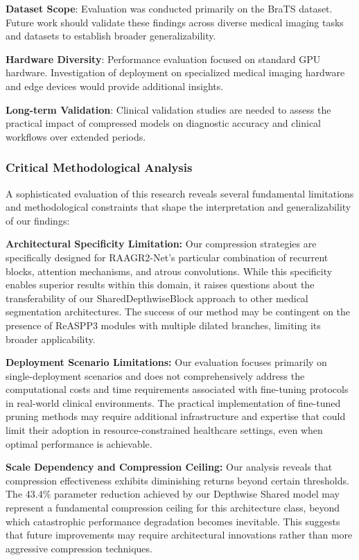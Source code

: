 \documentclass[12pt,a4paper]{article}
\begin{document}
\begin{enumerate}
\textbf{Dataset Scope}: Evaluation was conducted primarily on the BraTS dataset. Future work should validate these findings across diverse medical imaging tasks and datasets to establish broader generalizability.

\textbf{Hardware Diversity}: Performance evaluation focused on standard GPU hardware. Investigation of deployment on specialized medical imaging hardware and edge devices would provide additional insights.

\textbf{Long-term Validation}: Clinical validation studies are needed to assess the practical impact of compressed models on diagnostic accuracy and clinical workflows over extended periods.

\subsubsection{Critical Methodological Analysis}

A sophisticated evaluation of this research reveals several fundamental limitations and methodological constraints that shape the interpretation and generalizability of our findings:

\textbf{Architectural Specificity Limitation:} Our compression strategies are specifically designed for RAAGR2-Net's particular combination of recurrent blocks, attention mechanisms, and atrous convolutions. While this specificity enables superior results within this domain, it raises questions about the transferability of our SharedDepthwiseBlock approach to other medical segmentation architectures. The success of our method may be contingent on the presence of ReASPP3 modules with multiple dilated branches, limiting its broader applicability.

\textbf{Deployment Scenario Limitations:} Our evaluation focuses primarily on single-deployment scenarios and does not comprehensively address the computational costs and time requirements associated with fine-tuning protocols in real-world clinical environments. The practical implementation of fine-tuned pruning methods may require additional infrastructure and expertise that could limit their adoption in resource-constrained healthcare settings, even when optimal performance is achievable.

\textbf{Scale Dependency and Compression Ceiling:} Our analysis reveals that compression effectiveness exhibits diminishing returns beyond certain thresholds. The 43.4\% parameter reduction achieved by our Depthwise Shared model may represent a fundamental compression ceiling for this architecture class, beyond which catastrophic performance degradation becomes inevitable. This suggests that future improvements may require architectural innovations rather than more aggressive compression techniques.


\end{enumerate}
\end{document}
